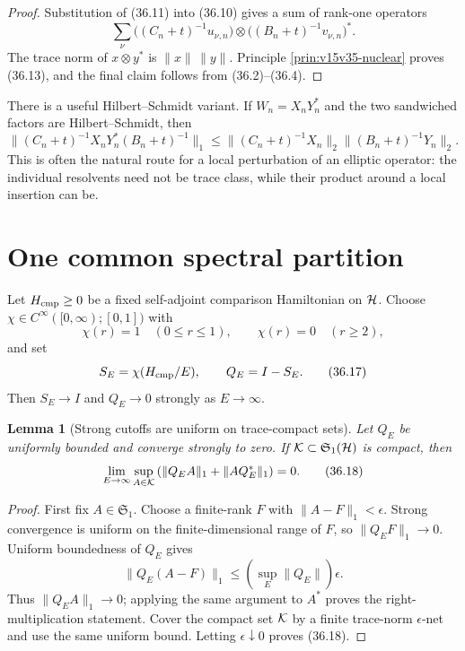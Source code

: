 \documentclass[11pt]{article}
\newtheorem{lemma}[theorem]{Lemma}
\theoremstyle{remark}
\begin{document}
\begin{proof}
Substitution of (36.11) into (36.10) gives a sum of rank-one
operators
\[
 \sum_\nu
 \bigl((C_n+t)^{-1}u_{\nu,n}\bigr)
 \otimes
 \bigl((B_n+t)^{-1}v_{\nu,n}\bigr)^*.
                                                               \tag{36.14}
\]
The trace norm of \(x\otimes y^*\) is \(\|x\|\,\|y\|\).
Principle \ref{prin:v15v35-nuclear} proves (36.13), and the final
claim follows from (36.2)--(36.4).
\end{proof}

There is a useful Hilbert--Schmidt variant.  If
\(W_n=X_nY_n^*\) and the two sandwiched factors are Hilbert--Schmidt,
then
\[
 \|(C_n+t)^{-1}X_nY_n^*(B_n+t)^{-1}\|_1
 \leq
 \|(C_n+t)^{-1}X_n\|_2
 \|(B_n+t)^{-1}Y_n\|_2.                                  \tag{36.15}
\]
This is often the natural route for a local perturbation of an
elliptic operator: the individual resolvents need not be trace
class, while their product around a local insertion can be.

\section{One common spectral partition}

Let \(H_{\rm cmp}\geq0\) be a fixed self-adjoint comparison
Hamiltonian on \({\cal H}\).  Choose
\(\chi\in C^\infty([0,\infty);[0,1])\) with
\[
 \chi(r)=1\quad(0\leq r\leq1),\qquad
 \chi(r)=0\quad(r\geq2),                                  \tag{36.16}
\]
and set
\[
 S_E=\chi(H_{\rm cmp}/E),\qquad Q_E=I-S_E.               \tag{36.17}
\]
Then \(S_E\to I\) and \(Q_E\to0\) strongly as \(E\to\infty\).

\begin{lemma}[Strong cutoffs are uniform on trace-compact sets]
\label{lem:v15v36-trace-compact-tail}
Let \(Q_E\) be uniformly bounded and converge strongly to zero.
If \({\cal K}\subset{\mathfrak S}_1({\cal H})\) is compact, then
\[
 \lim_{E\to\infty}\sup_{A\in{\cal K}}
 \left(\|Q_EA\|_1+\|AQ_E^*\|_1\right)=0.                 \tag{36.18}
\]
\end{lemma}

\begin{proof}
First fix \(A\in{\mathfrak S}_1\).  Choose a finite-rank \(F\) with
\(\|A-F\|_1<\epsilon\).  Strong convergence is uniform on the
finite-dimensional range of \(F\), so
\(\|Q_EF\|_1\to0\).  Uniform boundedness of \(Q_E\) gives
\[
 \|Q_E(A-F)\|_1\leq
 \left(\sup_E\|Q_E\|\right)\epsilon.                     \tag{36.19}
\]
Thus \(\|Q_EA\|_1\to0\); applying the same argument to \(A^*\)
proves the right-multiplication statement.  Cover the compact set
\({\cal K}\) by a finite trace-norm \(\epsilon\)-net and use the
same uniform bound.  Letting \(\epsilon\downarrow0\) proves (36.18).
\end{proof}
\end{document}
